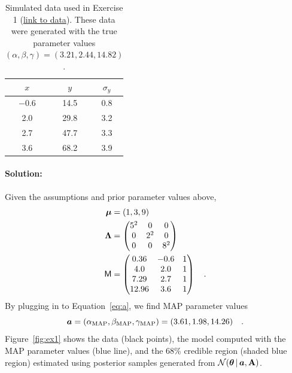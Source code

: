 \begin{table}[t!]
  \footnotesize
  \begin{center}
    \begin{tabular}{c|c|c}
      $x$ & $y$ & $\sigma_y$ \\
      \hline
      $-0.6$ & 14.5 & 0.8 \\
      2.0 & 29.8 & 3.2 \\
      2.7 & 47.7 & 3.3 \\
      3.6 & 68.2 & 3.9
    \end{tabular}
    \caption{Simulated data used in Exercise 1
    (\href{https://raw.githubusercontent.com/davidwhogg/GaussianProductRefactor/master/notebooks/data1.csv}{link to data}). These data were generated with the true parameter values $(\alpha, \beta, \gamma) = (3.21, 2.44, 14.82)$.
    \label{tbl:data1}}
  \end{center}
\end{table}


\paragraph{Solution:} Given the assumptions and prior parameter values
above,
\begin{align}
  \boldsymbol{\mu} &= (1, 3, 9)\\
  \mathbf{\Lambda} &=
    \begin{pmatrix}
      5^2 & 0 & 0\\
      0 & 2^2 & 0\\
      0 & 0 & 8^2
    \end{pmatrix}\\
  \mathsf{M} &= \begin{pmatrix}
      0.36 & -0.6 & 1\\
      4.0 & 2.0 & 1\\
      7.29 & 2.7 & 1\\
      12.96 & 3.6 & 1
    \end{pmatrix} \quad .
\end{align}
By plugging in to Equation~\ref{eq:a}, we find MAP parameter values
\begin{equation}
  \boldsymbol{a} =
    (\alpha_{\rm MAP}, \beta_{\rm MAP}, \gamma_{\rm MAP}) =
      (3.61, 1.98, 14.26) \quad .
\end{equation}
Figure~\ref{fig:ex1} shows the data (black points), the model computed with the
MAP parameter values (blue line), and the 68\% credible region (shaded blue
region) estimated using posterior samples generated from
$\mathcal{N}\!\,(\boldsymbol{\theta}\,|\,\boldsymbol{a},\mathbf{A})$.

